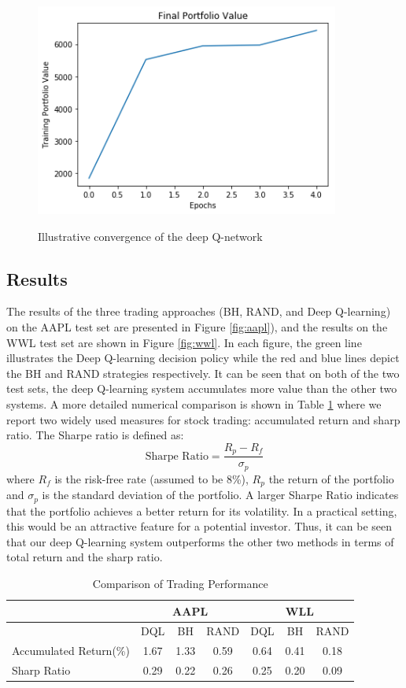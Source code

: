 \documentclass[12pt, authoryear]{elsarticle}
\begin{document}
\begin{figure}[h!]
	\centering
	\caption{Illustrative convergence of the deep Q-network}
	\includegraphics[clip, angle=0, width=10cm]{figures/training.png}
	\label{fig:1}
\end{figure}

\subsection{Results}

The results of the three trading approaches (BH, RAND, and Deep Q-learning) on the AAPL test set are presented in Figure \ref{fig:aapl}), and the results on the WWL test set are shown in Figure \ref{fig:wwl}. In each figure, the green line illustrates the Deep Q-learning decision policy while the red and blue lines depict the BH and RAND strategies respectively. It can be seen that on both of the two test sets, the deep Q-learning system accumulates more value than the other two systems. A more detailed numerical comparison is shown in Table \ref{table-1} where we report two widely used measures for stock trading: accumulated return and sharp ratio. The Sharpe ratio is defined as:
$$
\text {Sharpe Ratio} = \frac { R _ { p } - R _ { f } } { \sigma _ { p } }
$$
where $R_{f}$ is the risk-free rate (assumed to be 8\%), $R_{p}$ the return of the portfolio and $\sigma_{p}$ is the standard deviation of the portfolio. A larger Sharpe Ratio indicates that the portfolio achieves a better return for its volatility. In a practical setting, this would be an attractive feature for a potential investor. Thus, it can be seen that our deep Q-learning system outperforms the other two methods in terms of total return and the sharp ratio.

\begin{table}[h!]
	\centering
	\caption{Comparison of Trading Performance}
	\label{table-1}
	\begin{tabular}{lcccccc} \\ \hline\hline
		& \multicolumn{3}{c}{AAPL} & \multicolumn{3}{c}{WLL} \\ \hline
		& DQL & BH & RAND & DQL & BH & RAND \\ \hline
		Accumulated Return(\%) & 1.67 & 1.33 & 0.59 & 0.64 & 0.41 & 0.18 \\
		Sharp Ratio & 0.29 & 0.22 & 0.26 & 0.25 & 0.20 & 0.09 \\\hline\hline
	\end{tabular}
\end{table}
\end{document}

